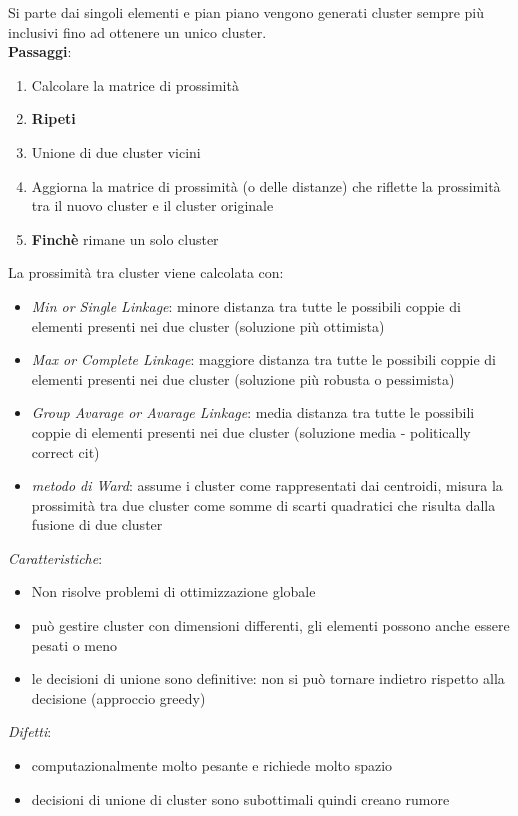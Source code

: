 Si parte dai singoli elementi e pian piano vengono generati cluster sempre pi\`u inclusivi fino ad ottenere un unico cluster. \\

\noindent
\textbf{Passaggi}:
\begin{enumerate}
	\item Calcolare la matrice di prossimit\`a
	\item \textbf{Ripeti}
	\item Unione di due cluster vicini
	\item Aggiorna la matrice di prossimit\`a (o delle distanze) che riflette la prossimit\`a tra il nuovo cluster e il cluster originale
	\item \textbf{Finch\`e} rimane un solo cluster
\end{enumerate}
\noindent
La prossimit\`a tra cluster viene calcolata con:
\begin{itemize}
	\item  \textit{Min or Single Linkage}: minore distanza tra tutte le possibili coppie di elementi presenti nei due cluster (soluzione pi\`u ottimista)
	\item \textit{Max or Complete Linkage}: maggiore distanza tra tutte le possibili coppie di elementi presenti nei due cluster (soluzione pi\`u robusta o pessimista)
	\item \textit{Group Avarage or Avarage Linkage}: media distanza tra tutte le possibili coppie di elementi presenti nei due cluster (soluzione media - politically correct cit)
	\item \textit{metodo di Ward}: assume i cluster come rappresentati dai centroidi, misura la prossimit\`a tra due cluster come somme di scarti quadratici che risulta dalla fusione di due cluster
\end{itemize}
\noindent
\textit{Caratteristiche}:
\begin{itemize}
	\item Non risolve problemi di ottimizzazione globale
	\item pu\`o gestire cluster con dimensioni differenti, gli elementi possono anche essere pesati o meno
	\item le decisioni di unione sono definitive: non si pu\`o tornare indietro rispetto alla decisione (approccio greedy)
\end{itemize}
\noindent
\textit{Difetti}:
\begin{itemize}
	\item computazionalmente molto pesante e richiede molto spazio
	\item decisioni di unione di cluster sono subottimali quindi creano rumore
\end{itemize}

